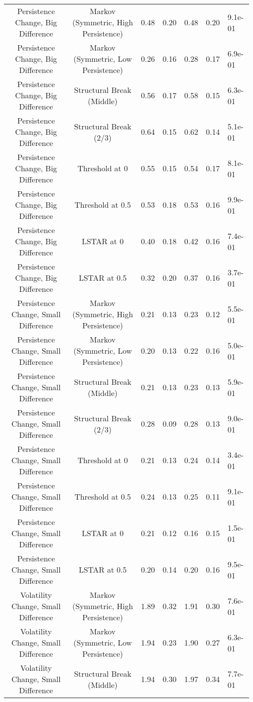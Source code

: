 \begin{table}[t]
\begin{tabular*}{\linewidth}{@{\extracolsep{\fill}}ccrrrrl}
Persistence Change, Big Difference & Markov (Symmetric, High Persistence) & 0.48 & 0.20 & 0.48 & 0.20 & 9.1e-01 \\ 
Persistence Change, Big Difference & Markov (Symmetric, Low Persistence) & 0.26 & 0.16 & 0.28 & 0.17 & 6.9e-01 \\ 
Persistence Change, Big Difference & Structural Break (Middle) & 0.56 & 0.17 & 0.58 & 0.15 & 6.3e-01 \\ 
Persistence Change, Big Difference & Structural Break (2/3) & 0.64 & 0.15 & 0.62 & 0.14 & 5.1e-01 \\ 
Persistence Change, Big Difference & Threshold at 0 & 0.55 & 0.15 & 0.54 & 0.17 & 8.1e-01 \\ 
Persistence Change, Big Difference & Threshold at 0.5 & 0.53 & 0.18 & 0.53 & 0.16 & 9.9e-01 \\ 
Persistence Change, Big Difference & LSTAR at 0 & 0.40 & 0.18 & 0.42 & 0.16 & 7.4e-01 \\ 
Persistence Change, Big Difference & LSTAR at 0.5 & 0.32 & 0.20 & 0.37 & 0.16 & 3.7e-01 \\ 
Persistence Change, Small Difference & Markov (Symmetric, High Persistence) & 0.21 & 0.13 & 0.23 & 0.12 & 5.5e-01 \\ 
Persistence Change, Small Difference & Markov (Symmetric, Low Persistence) & 0.20 & 0.13 & 0.22 & 0.16 & 5.0e-01 \\ 
Persistence Change, Small Difference & Structural Break (Middle) & 0.21 & 0.13 & 0.23 & 0.13 & 5.9e-01 \\ 
Persistence Change, Small Difference & Structural Break (2/3) & 0.28 & 0.09 & 0.28 & 0.13 & 9.0e-01 \\ 
Persistence Change, Small Difference & Threshold at 0 & 0.21 & 0.13 & 0.24 & 0.14 & 3.4e-01 \\ 
Persistence Change, Small Difference & Threshold at 0.5 & 0.24 & 0.13 & 0.25 & 0.11 & 9.1e-01 \\ 
Persistence Change, Small Difference & LSTAR at 0 & 0.21 & 0.12 & 0.16 & 0.15 & 1.5e-01 \\ 
Persistence Change, Small Difference & LSTAR at 0.5 & 0.20 & 0.14 & 0.20 & 0.16 & 9.5e-01 \\ 
Volatility Change, Small Difference & Markov (Symmetric, High Persistence) & 1.89 & 0.32 & 1.91 & 0.30 & 7.6e-01 \\ 
Volatility Change, Small Difference & Markov (Symmetric, Low Persistence) & 1.94 & 0.23 & 1.90 & 0.27 & 6.3e-01 \\ 
Volatility Change, Small Difference & Structural Break (Middle) & 1.94 & 0.30 & 1.97 & 0.34 & 7.7e-01 \\ 

\end{tabular*}
\end{table}
